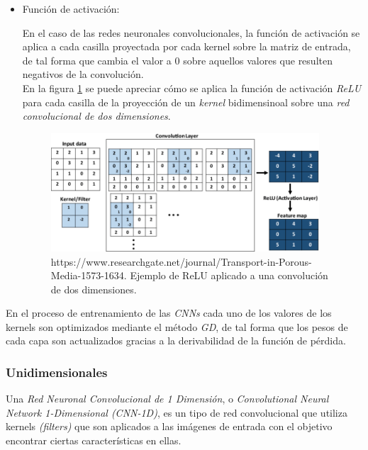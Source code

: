 \begin{itemize}
                \item Función de activación:


                    En el caso de las redes neuronales convolucionales, la función de activación se aplica a cada casilla proyectada por cada kernel sobre la matriz de entrada, de tal forma que cambia el valor a $0$ sobre aquellos valores que resulten negativos de la convolución.\\

                    En la figura \ref{CNNRELUImage} se puede apreciar cómo se aplica la función de activación \textit{ReLU} para cada casilla de la proyección de un \textit{kernel} bidimensinoal sobre una \textit{red convolucional de dos dimensiones}.



                    \begin{figure}[h]
                        \centering
                        \includegraphics[width=10cm]{archivos/CNN/CNNRELUImage}
                        \caption{https://www.researchgate.net/journal/Transport-in-Porous-Media-1573-1634. Ejemplo de ReLU aplicado a una convolución de dos dimensiones.}
                        \label{CNNRELUImage}
                     \end{figure}

            \end{itemize}

            En el proceso de entrenamiento de las \textit{CNNs} cada uno de los valores de los kernels son optimizados mediante el método \textit{GD}, de tal forma que los pesos de cada capa son actualizados gracias a la derivabilidad de la función de pérdida.\\



            \subsubsection{Unidimensionales}
            
                Una \textit{Red Neuronal Convolucional de 1 Dimensión}, o \textit{Convolutional Neural Network 1-Dimensional (CNN-1D)}, es un tipo de red convolucional que utiliza kernels \textit{(filters)} que son aplicados a las imágenes de entrada con el objetivo encontrar ciertas características en ellas.\\

